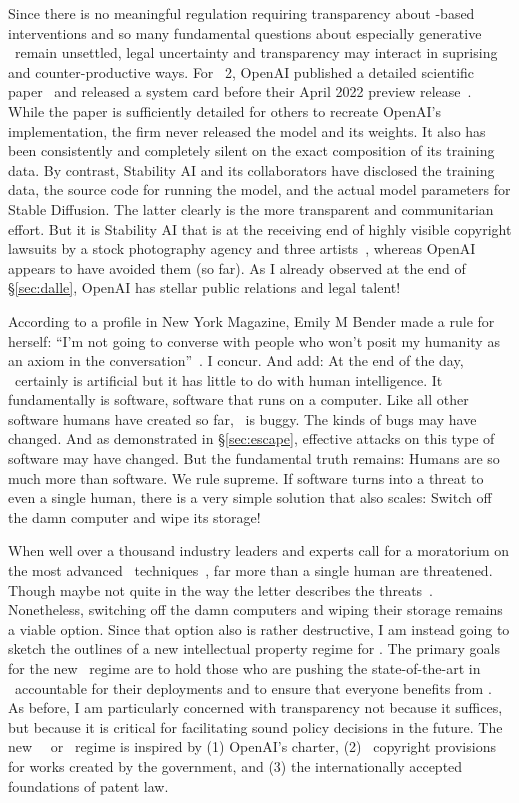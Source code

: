 Since there is no meaningful regulation requiring transparency about \AI-based
interventions and so many fundamental questions about especially generative \AI\
remain unsettled, legal uncertainty and transparency may interact in suprising
and counter-productive ways. For \DALLE~2, OpenAI published a detailed
scientific paper~\cite{RameshDhariwalea2022} and released a system card before
their April 2022 preview release~\cite{MishkinAhmad2022}. While the paper is
sufficiently detailed for others to recreate OpenAI's implementation, the firm
never released the model and its weights. It also has been consistently and
completely silent on the exact composition of its training data. By contrast,
Stability AI and its collaborators have disclosed the training data, the source
code for running the model, and the actual model parameters for Stable
Diffusion. The latter clearly is the more transparent and communitarian effort.
But it is Stability AI that is at the receiving end of highly visible copyright
lawsuits by a stock photography agency and three
artists~\cite{Butterick2023,Setty2023}, whereas OpenAI appears to have avoided
them (so far). As I already observed at the end of \S\ref{sec:dalle}, OpenAI has
stellar public relations and legal talent!

According to a profile in New York Magazine, Emily M Bender made a rule for
herself: ``I'm not going to converse with people who won't posit my humanity as
an axiom in the conversation''~\cite{Weil2023}. I concur. And add: At the end of
the day, \AI\ certainly is artificial but it has little to do with human
intelligence. It fundamentally is software, software that runs on a computer.
Like all other software humans have created so far, \AI\ is buggy. The kinds of
bugs may have changed. And as demonstrated in \S\ref{sec:escape}, effective
attacks on this type of software may have changed. But the fundamental truth
remains: Humans are so much more than software. We rule supreme. If software
turns into a threat to even a single human, there is a very simple solution that
also scales: Switch off the damn computer and wipe its storage!

When well over a thousand industry leaders and experts call for a moratorium on
the most advanced \AI\ techniques~\cite{MetzSchmidt2023}, far more than a single
human are threatened. Though maybe not quite in the way the letter describes the
threats~\cite{KapoorNarayanan2023}. Nonetheless, switching off the damn
computers and wiping their storage remains a viable option. Since that option
also is rather destructive, I am instead going to sketch the outlines of a new
intellectual property regime for \AI. The primary goals for the new \IP\ regime
are to hold those who are pushing the state-of-the-art in \AI\ accountable for
their deployments and to ensure that everyone benefits from \AI. As before, I am
particularly concerned with transparency not because it suffices, but because it
is critical for facilitating sound policy decisions in the future. The new \AI\
\IP\ or \AIP\ regime is inspired by (1) OpenAI's charter, (2) \US\ copyright
provisions for works created by the government, and (3) the internationally
accepted foundations of patent law.

